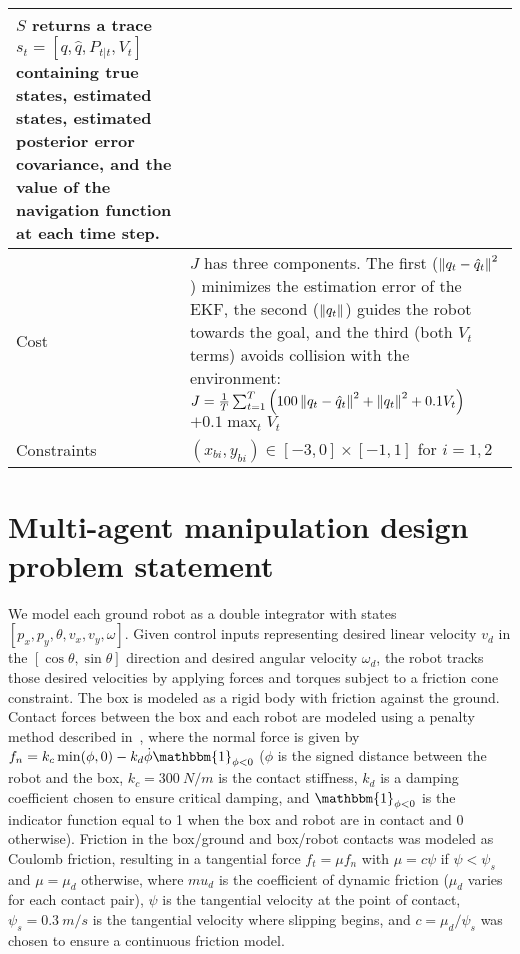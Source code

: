 \begin{table}[tb]
\begin{tabular}{|p{2.5cm}|p{14cm}|}
        $S$ returns a trace $s_t = [q, \hat{q}, P_{t|t}, V_t]$ containing true states, estimated states, estimated posterior error covariance, and the value of the navigation function at each time step.
        \\ \hline
        Cost                 & $J$ has three components. The first ($\left\lVert q_t - \hat{q}_t\right\rVert^2$) minimizes the estimation error of the EKF, the second ($\left\lVert q_t\right\rVert$) guides the robot towards the goal, and the third (both $V_t$ terms) avoids collision with the environment:
        $J = \frac{1}{T} \sum_{t=1}^T \left( 100 \left\lVert q_t - \hat{q}_t\right\rVert^2 + \left\lVert q_t\right\rVert^2 + 0.1 V_t \right)$ $+ 0.1 \max_t V_t$
        \\ \hline
        Constraints          & $(x_{bi}, y_{bi}) \in [-3, 0] \times [-1, 1]$ for $i=1, 2$                                                                                                                                                                                                                                                                                                                                                                                                                                                                                                                                     \\ \hline
    \end{tabular}
\end{table}

\section{Multi-agent manipulation design problem statement}

We model each ground robot as a double integrator with states $[p_x, p_y, \theta, v_x, v_y, \omega]$. Given control inputs representing desired linear velocity $v_d$ in the $[\cos\theta, \sin\theta]$ direction and desired angular velocity $\omega_d$, the robot tracks those desired velocities by applying forces and torques subject to a friction cone constraint. The box is modeled as a rigid body with friction against the ground. Contact forces between the box and each robot are modeled using a penalty method described in~\cite{suh2021_bundled_gradients}, where the normal force is given by $f_n = k_c \min(\phi, 0) - k_d \dot{\phi} \mathbbm{1}_{\phi < 0}$ ($\phi$ is the signed distance between the robot and the box, $k_c = \SI{300}{N/m}$ is the contact stiffness, $k_d$ is a damping coefficient chosen to ensure critical damping, and $\mathbbm{1}_{\phi < 0}$ is the indicator function equal to 1 when the box and robot are in contact and 0 otherwise). Friction in the box/ground and box/robot contacts was modeled as Coulomb friction, resulting in a tangential force $f_t = \mu f_n$ with $\mu = c\psi$ if $\psi < \psi_s$ and $\mu = \mu_d$ otherwise, where $mu_d$ is the coefficient of dynamic friction ($\mu_d$ varies for each contact pair), $\psi$ is the tangential velocity at the point of contact, $\psi_s = \SI{0.3}{m/s}$ is the tangential velocity where slipping begins, and $c = \mu_d / \psi_s$ was chosen to ensure a continuous friction model.

